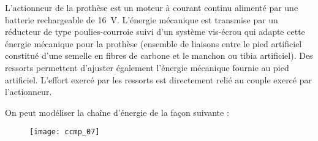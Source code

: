 L'actionneur de la prothèse est un moteur à courant continu alimenté par une batterie rechargeable de \SI{16}{V}. L'énergie mécanique est transmise par un
réducteur de type poulies-courroie suivi d'un
système vis-écrou qui adapte cette énergie
mécanique pour la prothèse (ensemble de liaisons
entre le pied artificiel constitué d'une semelle en
fibres de carbone et le manchon ou tibia artificiel).
Des ressorts permettent d'ajuster également l'énergie
mécanique fournie au pied artificiel. L'effort exercé
par les ressorts est directement relié au couple
exercé par l'actionneur.



On peut modéliser la chaîne d'énergie de la façon suivante : 
\begin{figure}[!h]
\texttt{[image: ccmp\_07]}
\end{figure}

